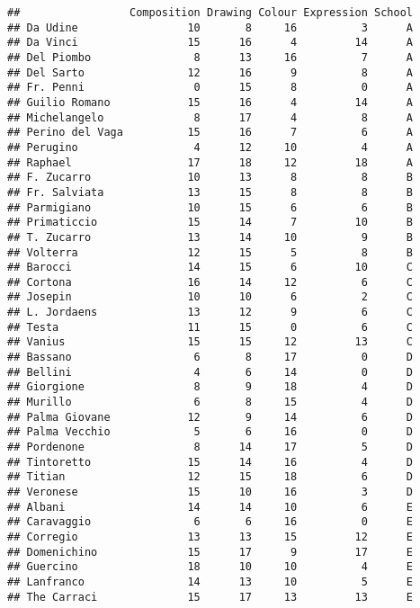 \documentclass[
]{article}
\begin{document}
\begin{verbatim}
##                 Composition Drawing Colour Expression School
## Da Udine                 10       8     16          3      A
## Da Vinci                 15      16      4         14      A
## Del Piombo                8      13     16          7      A
## Del Sarto                12      16      9          8      A
## Fr. Penni                 0      15      8          0      A
## Guilio Romano            15      16      4         14      A
## Michelangelo              8      17      4          8      A
## Perino del Vaga          15      16      7          6      A
## Perugino                  4      12     10          4      A
## Raphael                  17      18     12         18      A
## F. Zucarro               10      13      8          8      B
## Fr. Salviata             13      15      8          8      B
## Parmigiano               10      15      6          6      B
## Primaticcio              15      14      7         10      B
## T. Zucarro               13      14     10          9      B
## Volterra                 12      15      5          8      B
## Barocci                  14      15      6         10      C
## Cortona                  16      14     12          6      C
## Josepin                  10      10      6          2      C
## L. Jordaens              13      12      9          6      C
## Testa                    11      15      0          6      C
## Vanius                   15      15     12         13      C
## Bassano                   6       8     17          0      D
## Bellini                   4       6     14          0      D
## Giorgione                 8       9     18          4      D
## Murillo                   6       8     15          4      D
## Palma Giovane            12       9     14          6      D
## Palma Vecchio             5       6     16          0      D
## Pordenone                 8      14     17          5      D
## Tintoretto               15      14     16          4      D
## Titian                   12      15     18          6      D
## Veronese                 15      10     16          3      D
## Albani                   14      14     10          6      E
## Caravaggio                6       6     16          0      E
## Corregio                 13      13     15         12      E
## Domenichino              15      17      9         17      E
## Guercino                 18      10     10          4      E
## Lanfranco                14      13     10          5      E
## The Carraci              15      17     13         13      E

\end{verbatim}
\end{document}
